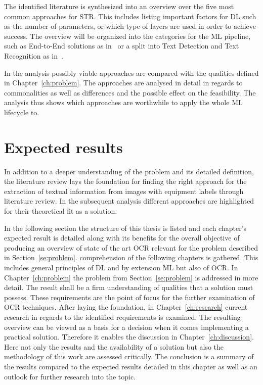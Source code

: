 The identified literature is synthesized into an overview over the five most common
approaches for \ac{STR}.
This includes listing important factors for \ac{DL} such as the number of parameters, or which
type of layers are used in order to achieve success.
The overview will be organized into the categories for the \ac{ML} pipeline, such as End-to-End
solutions as in~\cite{xing_convolutional_2019} or a split into Text Detection and Text Recognition
as in~\cite{yang_learning_2021, chen_improvement_2018}.

In the analysis possibly viable approaches are compared with the qualities defined
in Chapter~\ref{ch:problem}.
The approaches are analysed in detail in regards to commonalities as well as differences and the
possible effect on the feasibility.
The analysis thus shows which approaches are worthwhile to apply the whole \ac{ML} lifecycle to.

\section{Expected results}
In addition to a deeper understanding of the problem and its detailed definition, the literature
review lays the foundation for finding the right approach for the extraction of textual
information from images with equipment labels through literature review.
In the subsequent analysis different approaches are highlighted for their theoretical fit as a solution.

In the following section the structure of this thesis is listed and each chapter's expected
result is detailed along with its benefits for the overall objective of producing an overview of
state of the art \ac{OCR} relevant for the problem described in Section~\ref{se:problem}.
comprehension of the following chapters is gathered.
This includes general principles of \ac{DL} and by extension \ac{ML} but also of \ac{OCR}.\@
In Chapter~\ref{ch:problem} the problem from Section~\ref{se:problem} is addressed in more detail.
The result shall be a firm understanding of qualities that a solution must possess.
These requirements are the point of focus for the further examination of \ac{OCR} techniques.
After laying the foundation, in Chapter~\ref{ch:research} current research in regards to the
identified requirements is examined.
The resulting overview can be viewed as a basis for a decision when it comes implementing a practical
solution.
Therefore it enables the discussion in Chapter~\ref{ch:discussion}.
Here not only the results and the availability of a solution but also the methodology of this work
are assessed critically.
The conclusion is a summary of the results compared to the expected results detailed in this chapter
as well as an outlook for further research into the topic.

